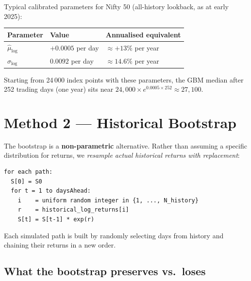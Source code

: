 \documentclass[11pt, a4paper]{article}
\begin{document}
Typical calibrated parameters for Nifty 50 (all-history lookback, as at early 2025):

\begin{center}
\begin{tabular}{lll}
  \toprule
  Parameter & Value & Annualised equivalent \\
  \midrule
  $\hat\mu_{\log}$ & $+0.0005$ per day & $\approx +13\%$ per year \\
  $\hat\sigma_{\log}$ & $0.0092$ per day & $\approx 14.6\%$ per year \\
  \bottomrule
\end{tabular}
\end{center}

Starting from 24\,000 index points with these parameters, the GBM median after 252 trading days (one year) sits near $24{,}000 \times e^{0.0005 \times 252} \approx 27{,}100$.

\section{Method 2 — Historical Bootstrap}
\label{sec:bootstrap}

The bootstrap is a \textbf{non-parametric} alternative. Rather than assuming a specific distribution for returns, we \emph{resample actual historical returns with replacement}:

\begin{tcolorbox}[mathbox]
\begin{verbatim}
for each path:
  S[0] = S0
  for t = 1 to daysAhead:
    i    = uniform random integer in {1, ..., N_history}
    r    = historical_log_returns[i]
    S[t] = S[t-1] * exp(r)
\end{verbatim}
\end{tcolorbox}

Each simulated path is built by randomly selecting days from history and chaining their returns in a new order.

\subsection*{What the bootstrap preserves vs.\ loses}
\end{document}

